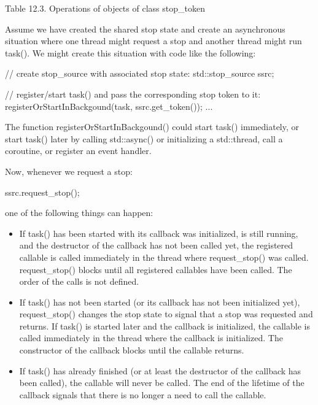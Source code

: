 \begin{center}
Table 12.3. Operations of objects of class stop\_token
\end{center}

Assume we have created the shared stop state and create an asynchronous situation where one thread might request a stop and another thread might run task(). We might create this situation with code like the following:

\begin{cpp}
// create stop_source with associated stop state:
std::stop_source ssrc;

// register/start task() and pass the corresponding stop token to it:
registerOrStartInBackgound(task, ssrc.get_token());
...
\end{cpp}

The function registerOrStartInBackgound() could start task() immediately, or start task() later by calling std::async() or initializing a std::thread, call a coroutine, or register an event handler.

Now, whenever we request a stop:

\begin{cpp}
ssrc.request_stop();
\end{cpp}

one of the following things can happen:

\begin{itemize}
\item 
If task() has been started with its callback was initialized, is still running, and the destructor of the callback has not been called yet, the registered callable is called immediately in the thread where request\_stop() was called. request\_stop() blocks until all registered callables have been called. The order of the calls is not defined.

\item
If task() has not been started (or its callback has not been initialized yet), request\_stop() changes the stop state to signal that a stop was requested and returns. If task() is started later and the callback is initialized, the callable is called immediately in the thread where the callback is initialized. The constructor of the callback blocks until the callable returns.

\item
If task() has already finished (or at least the destructor of the callback has been called), the callable will never be called. The end of the lifetime of the callback signals that there is no longer a need to call the callable.
\end{itemize}

